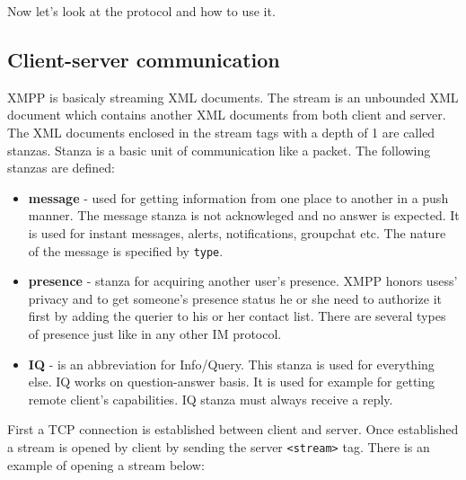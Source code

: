 Now let's look at the protocol and how to use it. 

\subsection*{Client-server communication}
XMPP is basicaly streaming XML documents. The stream is an unbounded XML document which contains another XML documents from both client and server. The XML documents enclosed in the stream tags with a depth of 1 are called stanzas. Stanza is a basic unit of communication like a packet. The following stanzas are defined:

\begin{itemize}
	\item \textbf{message} - used for getting information from one place to another in a push manner. The message stanza is not acknowleged and no answer is expected. It is used for instant messages, alerts, notifications, groupchat etc. The nature of the message is specified by \verb|type|.  
	\item \textbf{presence} - stanza for acquiring another user's presence. XMPP honors usess' privacy and to get someone's presence status he or she need to authorize it first by adding the querier to his or her contact list. There are several types of presence just like in any other IM protocol.     
	\item	\textbf{IQ} - is an abbreviation for Info/Query. This stanza is used for everything else. IQ works on question-answer basis. It is used for example for getting remote client's capabilities. IQ stanza must always receive a reply. 
\end{itemize}

First a TCP connection is established between client and server. Once established a stream is opened by client by sending the server \verb|<stream>| tag. There is an example of opening a stream below: 


%

